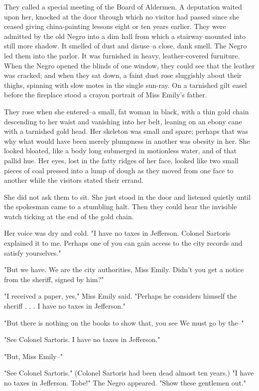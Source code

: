\documentclass[10pt,a4paper]{article}
\begin{document}
They called a special meeting of the Board of Aldermen. A deputation waited upon her, knocked at the door through which no visitor had passed since she ceased giving china-painting lessons eight or ten years earlier. They were admitted by the old Negro into a dim hall from which a stairway mounted into still more shadow. It smelled of dust and disuse--a close, dank smell. The Negro led them into the parlor. It was furnished in heavy, leather-covered furniture. When the Negro opened the blinds of one window, they could see that the leather was cracked; and when they sat down, a faint dust rose sluggishly about their thighs, spinning with slow motes in the single sun-ray. On a tarnished gilt easel before the fireplace stood a crayon portrait of Miss Emily's father.

They rose when she entered--a small, fat woman in black, with a thin gold chain descending to her waist and vanishing into her belt, leaning on an ebony cane with a tarnished gold head. Her skeleton was small and spare; perhaps that was why what would have been merely plumpness in another was obesity in her. She looked bloated, like a body long submerged in motionless water, and of that pallid hue. Her eyes, lost in the fatty ridges of her face, looked like two small pieces of coal pressed into a lump of dough as they moved from one face to another while the visitors stated their errand.

She did not ask them to sit. She just stood in the door and listened quietly until the spokesman came to a stumbling halt. Then they could hear the invisible watch ticking at the end of the gold chain.

Her voice was dry and cold. "I have no taxes in Jefferson. Colonel Sartoris explained it to me. Perhaps one of you can gain access to the city records and satisfy yourselves."

"But we have. We are the city authorities, Miss Emily. Didn't you get a notice from the sheriff, signed by him?"

"I received a paper, yes," Miss Emily said. "Perhaps he considers himself the sheriff . . . I have no taxes in Jefferson."

"But there is nothing on the books to show that, you see We must go by the--"

"See Colonel Sartoris. I have no taxes in Jefferson."

"But, Miss Emily--"

"See Colonel Sartoris." (Colonel Sartoris had been dead almost ten years.) "I have no taxes in Jefferson. Tobe!" The Negro appeared. "Show these gentlemen out."
\end{document}
